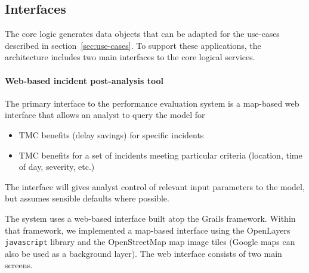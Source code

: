 \documentclass[12pt]{report}
\renewcommand{\fixme}[3][]{#1\xspace}
\newcounter{time}
\newcounter{space}
\begin{document}
\fixme{crindt}{flesh this out some.  Probably just collapse with the
  above section.}



\subsection{Interfaces}
\label{sec:interfaces}

The core logic generates data objects that can be adapted for the
use-cases described in section~\ref{sec:use-cases}.  To support these
applications, the architecture includes two main interfaces to the
core logical services.  

\paragraph{Web-based incident post-analysis tool}

The primary interface to the performance evaluation system is a
map-based web interface that allows an analyst to query the model for
\begin{itemize}
\item \ac{TMC} benefits (delay savings) for specific incidents
\item \ac{TMC} benefits for a set of incidents meeting particular criteria
  (location, time of day, severity, etc.)
\end{itemize}
The interface will gives analyst control of relevant input parameters to the
model, but assumes sensible defaults where possible.

The system uses a web-based interface built atop the Grails framework.  Within
that framework, we implemented a map-based interface using the OpenLayers
\texttt{javascript} library \citep{openlayers10:_openl_user_guide} and the
OpenStreetMap map image tiles \citep{openstreetmap.org10:_opens_devel_guide}
(Google maps can also be used as a background layer).  The web interface
consists of two main screens.  
\end{document}
